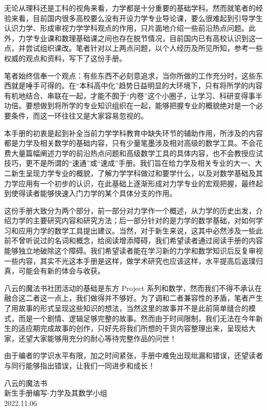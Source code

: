  {\itshapeCJK
  无论从理科还是工科的视角来看，力学都是十分重要的基础学科。然而就笔者的经验来看，目前国内很多高校要么没有开设力学专业导论课，要么很难起到引导学生认识力学、形成审视力学学科观点的作用，只片面地介绍一些前沿热点问题。此外，力学专业课和数理基础课之间也存在脱节情况，目前国内已有高校认识到这一点，并尝试组织课改。笔者针对以上两点问题，以个人经历及所见所知，参考一些权威的观点和资料，写下了这份手册。

  笔者始终信奉一个观点：有些东西不必刻意追求，当你所做的工作充分时，这些东西就是唾手可得的。在“本科高中化”趋势日益明显的大环境下，只有将所学的内容有机地结合、串联在一起，才能不囿于“内卷”这个小圈子，让学习、科研变得事半功倍。要想做到将所学的专业知识组织在一起，能够把握专业的概貌绝对是一个必要条件，而这一环往往又是大家容易忽视的。

  本手册的初衷是起到补全当前力学学科教育中缺失环节的辅助作用，所涉及的内容都是力学及相关数学的基础内容，只有少量笔墨涉及相对高级的数学工具。不会花费大量篇幅阐述力学的前沿热点问题和高级数学工具的具体内容，也不会教授应试技巧，更不是所谓的“速通”或“速成”手册。我们旨在给力学及相关专业的大一、大二新生呈现力学专业的概貌，了解力学学科做过和要学什么，以及对数学基础及其力学应用有一个初步的认识，在此基础上逐渐形成对力学专业的宏观把握，最终起到使得读者能够快速入门力学的某个具体分支的作用。

  这份手册大致分为两个部分，前一部分对力学作一个概述，从力学的历史出发，介绍力学的主要研究内容和研究方法；后一部分针对的是力学的数学基础，对如何学习和应用力学的数学工具提出建议。当然，对于新生来说，这其中必然涉及一些此前不曾听说过的名词和概念，给阅读增添障碍，我们希望读者通过阅读手册的内容能够独立地破除这个障碍。我们希望读者能在学习新的力学和数学知识后反复审视一些内容，其实不光这本手册是这样，做学术研究也应该这样，水平提高后返璞归真，可能会有新的体会与收获。

  八云的魔法书社团活动的基础是东方 Project 系列和数学，然而我们不得不承认在融合这二者这一点上，我们做得并不够好。为了调和二者兼容性的矛盾，笔者产生了用故事的形式呈现这些知识的想法，当然这里的故事并不是此前简单缝合的模式，而是一个剧情、逻辑足够完整的故事。然而由于时间限制，我们无法在今年新生的适应期完成故事的创作，只好先将我们所想的干货内容整理出来，呈现给大家，还望大家能够用充分的耐心等待完整作品的问世！

  由于编者的学识水平有限，加之时间紧张，手册中难免出现纰漏和错误，还望读者与同行能够指出错误，让我们一同进步和成长！
 }

\begin{flushright}
	八云的魔法书\\
	新生手册编写-力学及其数学小组\\
	2022.11.06
\end{flushright}





\restoregeometry